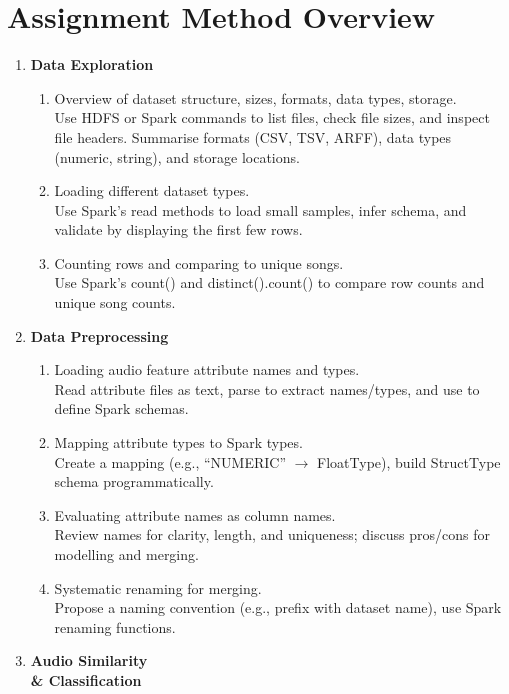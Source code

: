 
\section*{Assignment Method Overview}

\begin{enumerate}
  \item \textbf{Data Exploration}
    \begin{enumerate}
      \item Overview of dataset structure, sizes, formats, data types, storage.\\
      Use HDFS or Spark commands to list files, check file sizes, and inspect file headers. Summarise formats (CSV, TSV, ARFF), data types (numeric, string), and storage locations.
      \item Loading different dataset types.\\
      Use Spark's read methods to load small samples, infer schema, and validate by displaying the first few rows.
      \item Counting rows and comparing to unique songs.\\
      Use Spark's count() and distinct().count() to compare row counts and unique song counts.
    \end{enumerate}
  \item \textbf{Data Preprocessing}
    \begin{enumerate}
      \item Loading audio feature attribute names and types.\\
      Read attribute files as text, parse to extract names/types, and use to define Spark schemas.
      \item Mapping attribute types to Spark types.\\
      Create a mapping (e.g., ``NUMERIC'' $\rightarrow$ FloatType), build StructType schema programmatically.
      \item Evaluating attribute names as column names.\\
      Review names for clarity, length, and uniqueness; discuss pros/cons for modelling and merging.
      \item Systematic renaming for merging.\\
      Propose a naming convention (e.g., prefix with dataset name), use Spark renaming functions.
    \end{enumerate}
  \item \textbf{Audio Similarity \\& Classification}

\end{enumerate}
